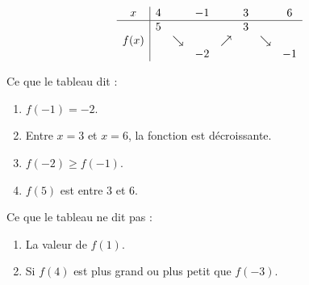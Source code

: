 \begin{example}
    \begin{equation*}
        \begin{array}[]{c|ccccccc}
            x&4&&-1&&3&&6\\
            \hline
            &5&&&&3&&\\
            f(x)&&\searrow&&\nearrow&&\searrow&\\
            &&&-2&&&&-1\\
        \end{array}
    \end{equation*}

Ce que le tableau dit :
\begin{enumerate}
    \item
        \( f(-1)=-2\).
    \item
        Entre \( x=3\) et \( x=6\), la fonction est décroissante.
    \item
        \( f(-2)\geq f(-1)\).
    \item
        \( f(5)\) est entre \( 3\) et \( 6\).
\end{enumerate}
Ce que le tableau ne dit pas :
\begin{enumerate}
    \item
        La valeur de \( f(1)\).
    \item
        Si \( f(4)\) est plus grand ou plus petit que \( f(-3)\).
\end{enumerate}

\end{example}
